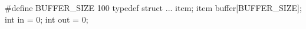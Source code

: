 \documentclass[varwidth=13em,crop]{standalone}
\begin{document}
\begin{ccode}
#define BUFFER_SIZE 100
typedef struct {
  ...
} item;
item buffer[BUFFER_SIZE];
int in = 0;
int out = 0;        
\end{ccode}
\end{document}
